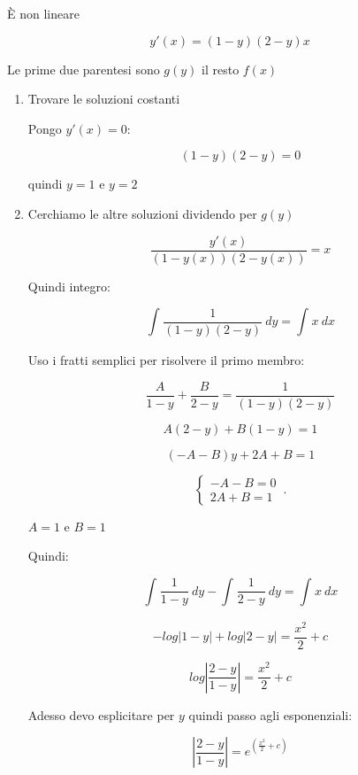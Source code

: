 \documentclass[../appunti-analisi.tex]{subfiles}
\begin{document}
È non lineare

\[
    y'(x) = (1-y)(2-y)x
\]

Le prime due parentesi sono $g(y)$ il resto $f(x)$

\begin{enumerate}
    \item Trovare le soluzioni costanti

        Pongo $y'(x) = 0 $:

        \[
            (1-y)(2-y) = 0
        \]

        quindi $y=1$ e $y=2$

    \item Cerchiamo le altre soluzioni dividendo per $g(y)$

        \[
            \frac{y'(x)}{(1-y(x))(2-y(x))} = x
        \]

        Quindi integro:

        \[
            \int_{{}}^{{}} {\frac{1}{(1-y)(2-y)} } \: d{y} {}= \int_{{}}^{{}} {x} \: d{x} {}
        \]

        Uso i fratti semplici per risolvere il primo membro:

        \[
            \frac{A}{1-y} + \frac{B}{2-y} = \frac{1}{(1-y)(2-y)} 
        \]

        \[
            A(2-y)+B(1-y) = 1
        \]

        \[
            (-A -B) y +2A + B = 1
        \]

        \begin{equation}
            \begin{cases}
              -A -B = 0\\
              2A+B= 1
            \end{cases}\,.
        \end{equation}

        $A=1$ e $B=1$
        
        Quindi:

        \[
            \int_{{}}^{{}} {\frac{1}{1-y}} \: d{y} {}- \int_{{}}^{{}} {\frac{1}{2-y} } \: d{y} {} = \int_{{}}^{{}} {x} \: d{x} {}
        \]

        \[
            -log|1-y| + log|2-y| = \frac{x ^{2}}{2} +c
        \]

        \[
            log|\frac{2-y}{1-y} | = \frac{x ^{2}}{2} +c
        \]

        Adesso devo esplicitare per $y$ quindi passo agli esponenziali:

        \[
            |\frac{2-y}{1-y} | = e^{(\frac{x ^{2}}{2} +c)}
        \]


\end{enumerate}
\end{document}
